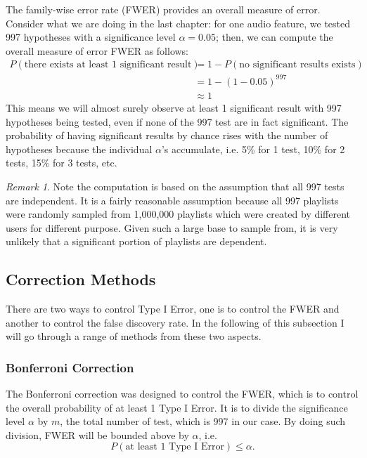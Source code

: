 \documentclass[12pt]{article}
\theoremstyle{plain}
\theoremstyle{definition}
\theoremstyle{remark}
\newtheorem*{remark}{Remark}
\begin{document}
The family-wise error rate (FWER) provides an overall measure of error.\cite{5.1} Consider what we are doing in the last chapter: for one audio feature, we tested 997 hypotheses with a significance level $\alpha=0.05$; then, we can compute the overall measure of error FWER\cite{5.4} as follows:
\begin{align*}
    P(\text{there exists at least 1 significant result})&=1-P(\text{no significant results exists})\\
    &=1-(1-0.05)^{997}\\
    &\approx 1
\end{align*}
This means we will almost surely observe at least 1 significant result with 997 hypotheses being tested, even if none of the 997 test are in fact significant. The probability of having significant results by chance rises with the number of hypotheses because the individual $\alpha$'s accumulate, i.e. 5\% for 1 test, 10\% for 2 tests, 15\% for 3 tests, etc.\cite{5.4}



\begin{remark}
Note the computation is based on the assumption that all 997 tests are independent. It is a fairly reasonable assumption because all 997 playlists were randomly sampled from 1,000,000 playlists which were created by different users for different purpose. Given such a large base to sample from, it is very unlikely that a significant portion of playlists are dependent.
\end{remark}

\newpage
\subsection{Correction Methods}
There are two ways to control Type I Error, one is to control the FWER and another to control the false discovery rate. In the following of this subsection I will go through a range of methods from these two aspects.

\subsubsection{Bonferroni Correction}
The Bonferroni correction was designed to control the FWER, which is to control the overall probability of at least 1 Type I Error. It is to divide the significance level $\alpha$ by $m$, the total number of test, which is 997 in our case. By doing such division, FWER will be bounded above by $\alpha$, i.e. 
\[P(\text{at least 1 Type I Error})\leq \alpha.\]
\end{document}
